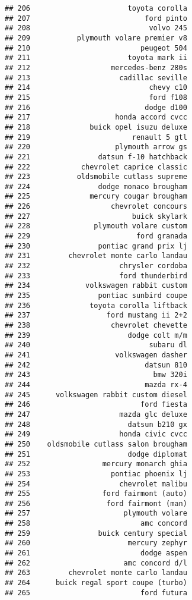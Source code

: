 \documentclass[
]{article}
\begin{document}
\begin{verbatim}
## 206                       toyota corolla
## 207                           ford pinto
## 208                            volvo 245
## 209           plymouth volare premier v8
## 210                          peugeot 504
## 211                       toyota mark ii
## 212                   mercedes-benz 280s
## 213                     cadillac seville
## 214                            chevy c10
## 215                            ford f108
## 216                           dodge d100
## 217                    honda accord cvcc
## 218              buick opel isuzu deluxe
## 219                        renault 5 gtl
## 220                    plymouth arrow gs
## 221                datsun f-10 hatchback
## 222            chevrolet caprice classic
## 223           oldsmobile cutlass supreme
## 224                dodge monaco brougham
## 225              mercury cougar brougham
## 226                   chevrolet concours
## 227                        buick skylark
## 228               plymouth volare custom
## 229                         ford granada
## 230                pontiac grand prix lj
## 231         chevrolet monte carlo landau
## 232                     chrysler cordoba
## 233                     ford thunderbird
## 234             volkswagen rabbit custom
## 235                pontiac sunbird coupe
## 236              toyota corolla liftback
## 237                  ford mustang ii 2+2
## 238                   chevrolet chevette
## 239                       dodge colt m/m
## 240                            subaru dl
## 241                    volkswagen dasher
## 242                           datsun 810
## 243                             bmw 320i
## 244                           mazda rx-4
## 245      volkswagen rabbit custom diesel
## 246                          ford fiesta
## 247                     mazda glc deluxe
## 248                       datsun b210 gx
## 249                     honda civic cvcc
## 250    oldsmobile cutlass salon brougham
## 251                       dodge diplomat
## 252                 mercury monarch ghia
## 253                   pontiac phoenix lj
## 254                     chevrolet malibu
## 255                 ford fairmont (auto)
## 256                  ford fairmont (man)
## 257                      plymouth volare
## 258                          amc concord
## 259                buick century special
## 260                       mercury zephyr
## 261                          dodge aspen
## 262                      amc concord d/l
## 263         chevrolet monte carlo landau
## 264      buick regal sport coupe (turbo)
## 265                          ford futura

\end{verbatim}
\end{document}
